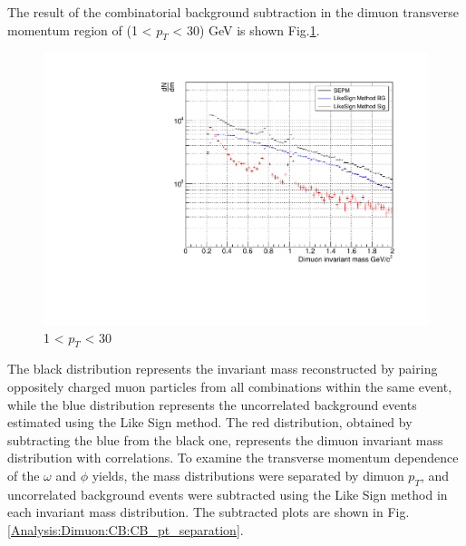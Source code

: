                 The result of the combinatorial background subtraction in the dimuon transverse momentum region of (1 < $p_T$ < 30) GeV is shown Fig.\ref{All_pt_CB}.
                \begin{figure}[H]
                    \centering
                    \includegraphics[keepaspectratio, scale=0.5]{fig/3_4_1_CB_pt_1to30.pdf}
                    \caption{1 < $p_{T}$ < 30}
                    \label{All_pt_CB}
                \end{figure}
                The black distribution represents the invariant mass reconstructed by pairing oppositely charged muon particles from all combinations within the same event, while the blue distribution represents the uncorrelated background events estimated using the Like Sign method. The red distribution, obtained by subtracting the blue from the black one, represents the dimuon invariant mass distribution with correlations.
                To examine the transverse momentum dependence of the $\omega$ and $\phi$ yields, the mass distributions were separated by dimuon $p_T$, and uncorrelated background events were subtracted using the Like Sign method in each invariant mass distribution. The subtracted plots are shown in Fig.\ref{Analysis:Dimuon:CB:CB_pt_separation}.


